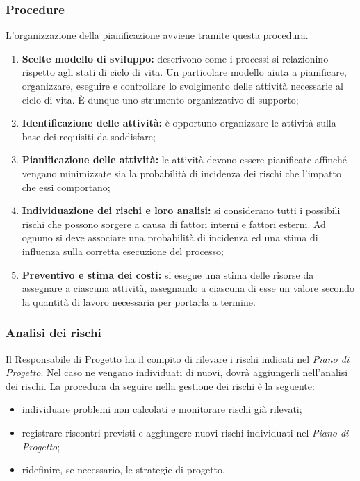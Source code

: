 \documentclass[11pt,a4paper]{article}
\begin{document}
\subsubsection{Procedure}

L’organizzazione della pianificazione avviene tramite questa procedura.

\begin{enumerate}
	\item \textbf{Scelte modello di sviluppo:} descrivono come i processi si relazionino rispetto agli stati di ciclo di vita. Un particolare modello aiuta a pianificare, organizzare, eseguire e controllare lo svolgimento delle attività necessarie al ciclo di vita. È dunque uno strumento organizzativo di supporto;
	\item \textbf{Identificazione delle attività:} è opportuno organizzare le attività sulla base dei requisiti da soddisfare;
	\item \textbf{Pianificazione delle attività:} le attività devono essere pianificate affinché vengano minimizzate sia la probabilità di incidenza dei rischi che l'impatto che essi comportano;
	\item \textbf{Individuazione dei rischi e loro analisi:} si considerano tutti i possibili rischi che possono sorgere a causa di fattori interni e fattori esterni. Ad ognuno si deve associare una probabilità di incidenza ed una stima di influenza sulla corretta esecuzione del processo;
	\item \textbf{Preventivo e stima dei costi:} si esegue una stima delle risorse da assegnare a ciascuna attività, assegnando a ciascuna di esse un valore secondo la quantità di lavoro necessaria per portarla a termine.
\end{enumerate}

\subsubsection{Analisi dei rischi}

Il Responsabile di Progetto ha il compito di rilevare i rischi indicati nel \textit{Piano di Progetto}. Nel caso ne vengano individuati di nuovi, dovrà aggiungerli nell'analisi dei rischi. La procedura da seguire nella gestione dei rischi è la seguente:
\begin{itemize}
	\item individuare problemi non calcolati e monitorare rischi già rilevati;
	\item registrare riscontri previsti e aggiungere nuovi rischi individuati nel \textit{Piano di Progetto};
	\item ridefinire, se necessario, le strategie di progetto.
\end{itemize}
\end{document}
